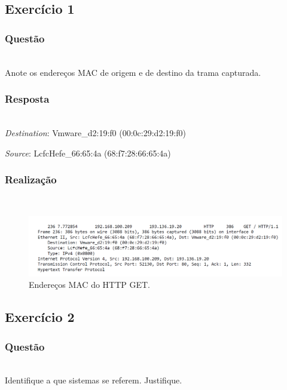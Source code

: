 \documentclass{llncs}
\begin{document}
\subsection{Exercício 1}
\subsubsection{Questão}\rule[-10pt]{0pt}{10pt}\\

Anote os endereços MAC de origem e de destino da trama capturada.

\subsubsection{Resposta}\rule[-10pt]{0pt}{10pt}\\

\textit{Destination}: Vmware\_d2:19:f0 (00:0c:29:d2:19:f0)

\textit{Source}: LcfcHefe\_66:65:4a (68:f7:28:66:65:4a)

\subsubsection{Realização}\rule[-10pt]{0pt}{10pt}\\

\begin{figure}
  \begin{center}
  \includegraphics[scale=0.35]{imagens/MACAddrGET.png} 
  \end{center}
  \caption{Endereços MAC do HTTP GET.}
  \label{fig:mac_addr}
\end{figure} 

\clearpage
\subsection{Exercício 2}
\subsubsection{Questão}\rule[-10pt]{0pt}{10pt}\\

Identifique a que sistemas se referem. Justifique.
\end{document}
